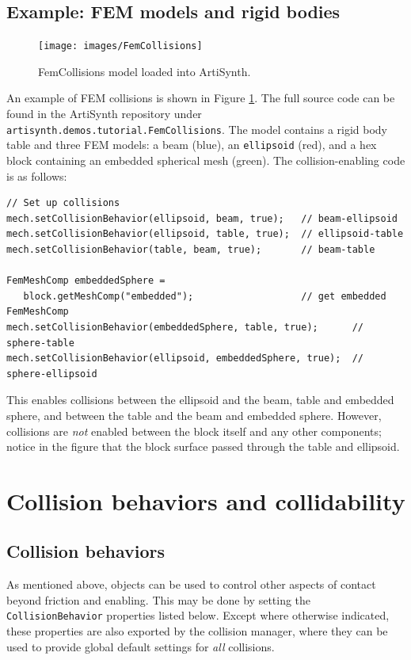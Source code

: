 \subsection{Example: FEM models and rigid bodies}

\begin{figure}[ht]
	\centering
	\texttt{[image: images/FemCollisions]}
	\caption{FemCollisions model loaded into ArtiSynth.}
	\label{fig:fem:collisions}
\end{figure}

An example of FEM collisions is shown in
Figure \ref{fig:fem:collisions}.  The full source code can be found in
the ArtiSynth repository under {\tt
artisynth.demos.tutorial.FemCollisions}. The model contains a rigid
body table and three FEM models: a beam (blue), an {\tt ellipsoid}
(red), and a hex block containing an embedded spherical mesh
(green).  The collision-enabling code is as follows:
\begin{lstlisting}[]
// Set up collisions
mech.setCollisionBehavior(ellipsoid, beam, true);   // beam-ellipsoid
mech.setCollisionBehavior(ellipsoid, table, true);  // ellipsoid-table
mech.setCollisionBehavior(table, beam, true);       // beam-table

FemMeshComp embeddedSphere = 
   block.getMeshComp("embedded");                   // get embedded FemMeshComp
mech.setCollisionBehavior(embeddedSphere, table, true);      // sphere-table
mech.setCollisionBehavior(ellipsoid, embeddedSphere, true);  // sphere-ellipsoid
\end{lstlisting}
This enables collisions between the ellipsoid and the beam, table and
embedded sphere, and between the table and the beam and embedded
sphere.  However, collisions are {\it not} enabled between the block
itself and any other components; notice in the figure that the block
surface passed through the table and ellipsoid.

\section{Collision behaviors and collidability}
\label{ControllingCollisions:sec}

\subsection{Collision behaviors}
\label{CollisionBehavior:sec}

As mentioned above,
 objects can
be used to control other aspects of contact beyond friction and
enabling. This may be done by setting the {\tt CollisionBehavior}
properties listed below. Except where otherwise indicated, these
properties are also exported by the collision manager, where they can
be used to provide global default settings for {\it all} collisions.

